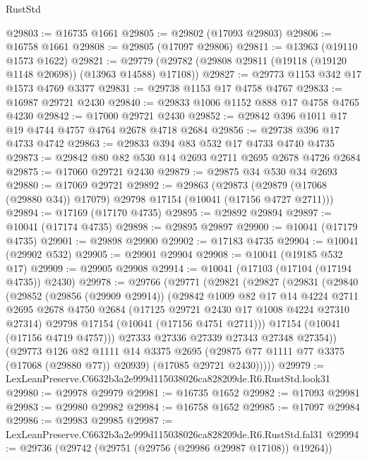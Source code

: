 \begin{lexlean}{RustStd}
\begin{coremodule}
@29803 := @16735 @1661
@29805 := @29802 (@17093 @29803)
@29806 := @16758 @1661
@29808 := @29805 (@17097 @29806)
@29811 := @13963 (@19110 @1573 @1622)
@29821 := @29779 (@29782 (@29808 @29811 (@19118 (@19120 @1148 @20698)) (@13963 @14588) @17108))
@29827 := @29773 @1153 @342 @17 @1573 @4769 @3377
@29831 := @29738 @1153 @17 @4758 @4767
@29833 := @16987 @29721 @2430
@29840 := @29833 @1006 @1152 @888 @17 @4758 @4765 @4230
@29842 := @17000 @29721 @2430
@29852 := @29842 @396 @1011 @17 @19 @4744 @4757 @4764 @2678 @4718 @2684
@29856 := @29738 @396 @17 @4733 @4742
@29863 := @29833 @394 @83 @532 @17 @4733 @4740 @4735
@29873 := @29842 @80 @82 @530 @14 @2693 @2711 @2695 @2678 @4726 @2684
@29875 := @17060 @29721 @2430
@29879 := @29875 @34 @530 @34 @2693
@29880 := @17069 @29721
@29892 := @29863
    (@29873 (@29879 (@17068 (@29880 @34)) @17079) @29798 @17154 (@10041 (@17156 @4727 @2711)))
@29894 := @17169 (@17170 @4735)
@29895 := @29892 @29894
@29897 := @10041 (@17174 @4735)
@29898 := @29895 @29897
@29900 := @10041 (@17179 @4735)
@29901 := @29898 @29900
@29902 := @17183 @4735
@29904 := @10041 (@29902 @532)
@29905 := @29901 @29904
@29908 := @10041 (@19185 @532 @17)
@29909 := @29905 @29908
@29914 := @10041 (@17103 (@17104 (@17194 @4735)) @2430)
@29978 := @29766
    (@29771
      (@29821
        (@29827
          (@29831
            (@29840
              (@29852
                (@29856 (@29909 @29914))
                (@29842
                  @1009
                  @82
                  @17
                  @14
                  @4224
                  @2711
                  @2695
                  @2678
                  @4750
                  @2684
                  (@17125 @29721 @2430 @17 @1008 @4224 @27310 @27314)
                  @29798
                  @17154
                  (@10041 (@17156 @4751 @2711)))
                @17154
                (@10041 (@17156 @4719 @4757)))
              @27333
              @27336
              @27339
              @27343
              @27348
              @27354))
          (@29773
            @126
            @82
            @1111
            @14
            @3375
            @2695
            (@29875 @77 @1111 @77 @3375 (@17068 (@29880 @77)) @20939)
            (@17085 @29721 @2430)))))
@29979 := LexLeanPreserve.C6632b3a2e999d115038026ca828209de.R6.RustStd.look31
@29980 := @29978 @29979
@29981 := @16735 @1652
@29982 := @17093 @29981
@29983 := @29980 @29982
@29984 := @16758 @1652
@29985 := @17097 @29984
@29986 := @29983 @29985
@29987 := LexLeanPreserve.C6632b3a2e999d115038026ca828209de.R6.RustStd.fal31
@29994 := @29736 (@29742 (@29751 (@29756 (@29986 @29987 @17108)) @19264))

\end{coremodule}
\end{lexlean}
